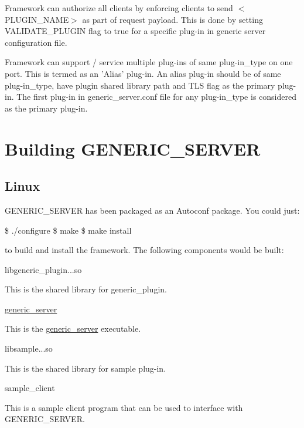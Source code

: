 \begin{DoxyItemize}
\item Framework can authorize all clients by enforcing clients to send $<$\-P\-L\-U\-G\-I\-N\-\_\-\-N\-A\-M\-E$>$ as part of request payload. This is done by setting V\-A\-L\-I\-D\-A\-T\-E\-\_\-\-P\-L\-U\-G\-I\-N flag to true for a specific plug-\/in in generic server configuration file.\end{DoxyItemize}
\begin{DoxyItemize}
\item Framework can support / service multiple plug-\/ins of same plug-\/in\-\_\-type on one port. This is termed as an 'Alias' plug-\/in. An alias plug-\/in should be of same plug-\/in\-\_\-type, have plugin shared library path and T\-L\-S flag as the primary plug-\/in. The first plug-\/in in generic\-\_\-server.\-conf file for any plug-\/in\-\_\-type is considered as the primary plug-\/in.\end{DoxyItemize}
\par
 \par
 \hypertarget{index_MK}{}\section{Building G\-E\-N\-E\-R\-I\-C\-\_\-\-S\-E\-R\-V\-E\-R}\label{index_MK}
\hypertarget{index_BL}{}\subsection{Linux}\label{index_BL}
G\-E\-N\-E\-R\-I\-C\-\_\-\-S\-E\-R\-V\-E\-R has been packaged as an Autoconf package. You could just\-: 
\begin{DoxyPre}
        \$ ./configure
        \$ make
        \$ make install
\end{DoxyPre}
 to build and install the framework. The following components would be built\-: \begin{DoxyItemize}
\item libgeneric\-\_\-plugin...\-so \par
 This is the shared library for generic\-\_\-plugin. \par
 \par
 \item \hyperlink{classgeneric__server}{generic\-\_\-server} \par
 This is the \hyperlink{classgeneric__server}{generic\-\_\-server} executable. \par
 \par
 \item libsample...\-so \par
 This is the shared library for sample plug-\/in. \par
 \par
 \item sample\-\_\-client \par
 This is a sample client program that can be used to interface with G\-E\-N\-E\-R\-I\-C\-\_\-\-S\-E\-R\-V\-E\-R. \par
 \par
 \end{DoxyItemize}

